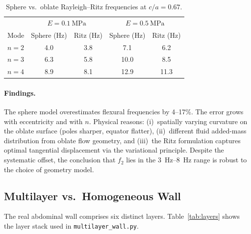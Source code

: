 \documentclass[12pt]{article}
\begin{document}
\begin{table}[htbp]
\centering
\caption{Sphere vs.\ oblate Rayleigh--Ritz frequencies at $c/a = 0.67$.}
\label{tab:oblate}
\begin{tabular}{@{}lSSSS@{}}
\toprule
& 
&  \\
\cmidrule(lr){2-3} \cmidrule(lr){4-5}
{Mode} & {Sphere (\si{\hertz})} & {Ritz (\si{\hertz})}
       & {Sphere (\si{\hertz})} & {Ritz (\si{\hertz})} \\
\midrule
$n=2$ & 4.0 & 3.8 & 7.1 & 6.2 \\
$n=3$ & 6.3 & 5.8 & 10.0 & 8.5 \\
$n=4$ & 8.9 & 8.1 & 12.9 & 11.3 \\
\bottomrule
\end{tabular}
\end{table}

\paragraph{Findings.}
The sphere model overestimates flexural frequencies by 4--17\%.  The error
grows with eccentricity and with $n$.  Physical reasons: (i)~spatially varying
curvature on the oblate surface (poles sharper, equator flatter), (ii)~different
fluid added-mass distribution from oblate flow geometry, and
(iii)~the Ritz formulation captures optimal tangential displacement via
the variational principle.  Despite the systematic offset, the conclusion that
$f_{2}$ lies in the \SIrange{3}{8}{\hertz} range is robust to the choice of
geometry model.


\subsection{Multilayer vs.\ Homogeneous Wall}
\label{sec:multilayer}

The real abdominal wall comprises six distinct layers.
Table~\ref{tab:layers} shows the layer stack used in
\texttt{multilayer\_wall.py}.
\end{document}
